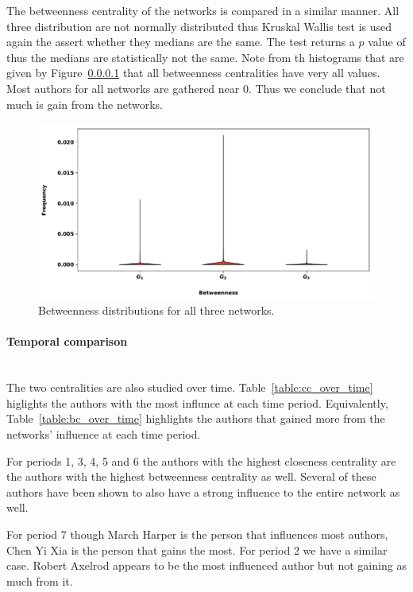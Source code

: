 \documentclass{article}
\theoremstyle{definition}
\begin{document}
The betweenness centrality of the networks is compared in a similar manner.
All three distribution are not normally distributed thus Kruskal Wallis test
is used again the assert whether they medians are the same. The test returns
a \(p\) value of  thus the medians are statistically not the same. Note from
th histograms that are given by Figure~\ref{} that all betweenness centralities
have very all values. Most authors for all networks are gathered near 0.
Thus we conclude that not much is gain from the networks.

\begin{figure}[!hbtp]
    \centering
    \includegraphics[width=\textwidth]{./assets/images/Betweenness_histrograms.pdf}
    \caption{Betweenness distributions for all three networks.}\label{fig:closeness_dist}
\end{figure}

\paragraph{Temporal comparison}
\mbox{ }\\

The two centralities are also studied over time. Table~\ref{table:cc_over_time} higlights
the authors with the most influnce at each time period. Equivalently, Table~\ref{table:bc_over_time}
highlights the authors that gained more from the networks' influence at each
time period.

For periods 1, 3, 4, 5 and 6 the authors with the highest closeness centrality
are the authors with the highest betweenness centrality as well. Several of these
authors have been shown to also have a strong influence to the entire network
as well.

For period 7 though March Harper is the person that influences most authors,
Chen Yi Xia is the person that gains the most. For period 2 we have a similar
case. Robert Axelrod appears to be the most influenced author but not gaining 
as much from it.
\end{document}
